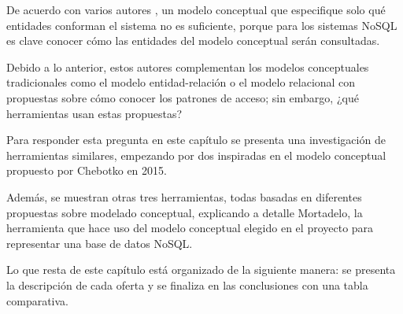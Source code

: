 De acuerdo con varios autores \cite{chebotko_big_2015,de_lima_workload-driven_2015,mior_nose_2017-1}, un modelo conceptual que especifique solo qué entidades conforman el sistema no es suficiente, porque para los sistemas NoSQL es clave conocer cómo las entidades del modelo conceptual serán consultadas.


Debido a lo anterior, estos autores complementan los modelos conceptuales tradicionales como el modelo entidad-relación o el modelo relacional con propuestas sobre cómo conocer los patrones de acceso; sin embargo, ¿qué herramientas usan estas propuestas?


Para responder esta pregunta en este capítulo se presenta una investigación de herramientas similares, empezando por dos inspiradas en el modelo conceptual propuesto por Chebotko en 2015.


Además, se muestran otras tres herramientas, todas basadas en diferentes propuestas sobre modelado conceptual, explicando a detalle Mortadelo, la herramienta que hace uso del modelo conceptual elegido en el proyecto para representar una base de datos NoSQL.


Lo que resta de este capítulo está organizado de la siguiente manera: se presenta la descripción de cada oferta y se finaliza en las conclusiones con una tabla comparativa.








